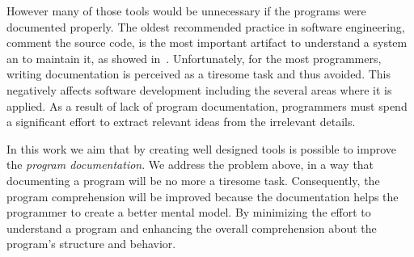However many of those tools would be unnecessary if the programs were documented properly. The oldest recommended practice in software engineering, comment the source code, is the most important artifact to understand a system an to maintain it, as showed in~\cite{de2005study}. Unfortunately, for the most programmers, writing documentation is perceived as a tiresome task and thus avoided. This negatively affects software development including the several areas where it is applied. As a result of lack of program documentation, programmers must spend a significant effort to extract relevant ideas from the irrelevant details.

In this work we aim that by creating well designed tools is possible to improve the \textit{program documentation}. We address the problem above, in a way that documenting a program will be no more a tiresome task. Consequently, the program comprehension will be improved because the documentation helps the programmer to create a better mental model. By minimizing the effort to understand a program and enhancing the overall comprehension about the program's structure and behavior.